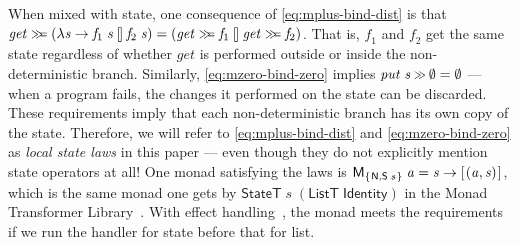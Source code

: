 \documentclass{llncs}
\newcommand{\Conid}[1]{\mathit{#1}}
\newcommand{\Varid}[1]{\mathit{#1}}
\let\Varid\mathit
\let\Conid\mathsf
\begin{document}
When mixed with state, one consequence of \eqref{eq:mplus-bind-dist} is that \ensuremath{\Varid{get}\mathrel{\hstretch{0.7}{>\!\!>\!\!=}}(\lambda \Varid{s}\to \Varid{f}_{1}\;\Varid{s}\mathbin{\talloblong}\Varid{f}_{2}\;\Varid{s})\mathrel{=}(\Varid{get}\mathrel{\hstretch{0.7}{>\!\!>\!\!=}}\Varid{f}_{1}\mathbin{\talloblong}\Varid{get}\mathrel{\hstretch{0.7}{>\!\!>\!\!=}}\Varid{f}_{2})}. That is, \ensuremath{\Varid{f}_{1}} and \ensuremath{\Varid{f}_{2}} get the same state regardless of whether \ensuremath{\Varid{get}} is performed outside or inside the non-deterministic branch.
Similarly, \eqref{eq:mzero-bind-zero} implies \ensuremath{\Varid{put}\;\Varid{s}\mathbin{\hstretch{0.7}{>\!\!>}}\emptyset\mathrel{=}\emptyset} --- when a program fails, the changes it performed on the state can be discarded.
These requirements imply that each non-deterministic branch has its own copy of the state.
Therefore, we will refer to \eqref{eq:mplus-bind-dist} and \eqref{eq:mzero-bind-zero} as \emph{local state laws} in this paper --- even though they do not explicitly mention state operators at all!
One monad satisfying the laws is \ensuremath{\Conid{M}_{\{\mskip1.5mu \Conid{N},\Conid{S}\;\Varid{s}\mskip1.5mu\}}\;\Varid{a}\mathrel{=}\Varid{s}\to [\mskip1.5mu (\Varid{a},\Varid{s})\mskip1.5mu]}, which is the same monad one gets by \ensuremath{\Conid{StateT}\;\Varid{s}\;(\Conid{ListT}\;\Conid{Identity})} in the Monad Transformer Library~\cite{MTL:14}.
With effect handling~\cite{Wu:14:Effect,KiselyovIshii:15:Freer}, the monad meets the requirements if we run the handler for state before that for list.
\end{document}
